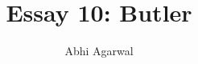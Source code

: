 \documentclass[11pt, oneside]{article}
\title{Essay 10: Butler}
\author{Abhi Agarwal}
\date{}
\begin{document}
\maketitle

\par 
\end{document}
